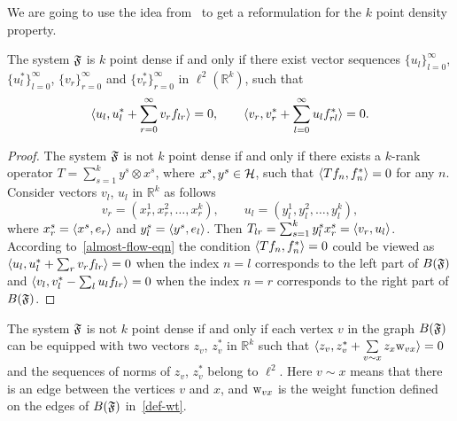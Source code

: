 \documentclass[12pt,oneside,a4paper]{amsart}
\begin{document}
      We are going to use the idea from~\cite{me} to get a reformulation for the $k$ point density property.
      \begin{prop}
        \label{prop-vec-est}
        The system $\fsys$ is $k$ point dense if and only if there exist vector sequences $\{u_l\}_{l=0}^\infty$, $\{u^*_l\}_{l=0}^\infty$,
          $\{v_r\}_{r=0}^\infty$ and $\{v^*_r\}_{r=0}^\infty$ in $\ell^2 (\mathbb{R}^k)$, such that
        \begin{equation}
          \label{prop-vec-eqn}
          \inner{u_l}{u^*_l + \sum_{r=0}^\infty v_r f_{lr}} = 0, \quad \quad
          \inner{v_r}{v^*_r + \sum_{l=0}^\infty u_l f_{rl}^*} = 0.
        \end{equation}
      \end{prop}
      \begin{proof}
        The system $\fsys$ is not $k$ point dense if and only if there exists a $k$-rank operator $T = \sum_{s=1}^k y^s \otimes x^s$, where
          $x^s, y^s \in \cal{H}$, such that $\inner{Tf_n}{f_n^*} = 0$ for any $n$.
        Consider vectors $v_l$, $u_l$ in $\mathbb{R}^k$ as follows
        \begin{equation*}
          v_r = (x^1_r, x^2_r, \dots, x^k_r),\qquad
          u_l = (y^1_l, y^2_l, \dots, y^k_l),
        \end{equation*}
          where $x^s_r = \inner{x^s}{e_r}$ and $y^s_l = \inner{y^s}{e_l}$.
        Then $T_{lr} = \sum_{s=1}^k y^s_l x^s_r = \inner{v_r}{u_l}$.
        According to~\eqref{almost-flow-eqn} the condition $\inner{Tf_n}{f^*_n} = 0$ could be viewed as
          $\inner{u_l}{u^*_l + \sum_r v_r f_{lr}} = 0$
        when the index $n=l$ corresponds to the left part of $B(\fsys)$ and
          $\inner{v_l}{v^*_l - \sum_l u_l f_{lr}} = 0$
        when the index $n=r$ corresponds to the right part of $B(\fsys)$.
      \end{proof}
      \begin{corol}
        \label{corol:kpd}
        The system $\fsys$ is not $k$ point dense if and only if each vertex $v$ in the graph $B(\fsys)$ can be
          equipped with two vectors $z_v$, $z_v^*$ in $\mathbb{R}^k$ such that
          $\inner{z_v}{z_v^* + \sum\limits_{v \sim x} z_x \wt_{vx}} = 0$ and
          the sequences of norms of $z_v$, $z_v^*$ belong to $\ell^2$.
          Here $v \sim x$ means that there is an edge between the vertices $v$ and $x$, and
          $\wt_{vx}$ is the weight function defined on the edges of $B(\fsys)$ in~\eqref{def-wt}.
      \end{corol}
\end{document}
